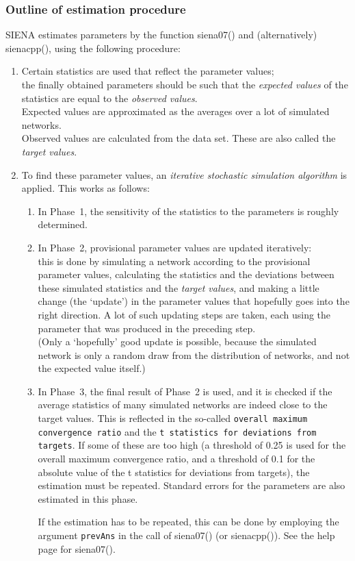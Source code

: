 \documentclass[a4paper,fleqn,11pt]{article}
\newcommand{\+}{\, + \,}
\newcommand{\sfn}[1]{\textsf{#1}}
\newcommand{\SI}{{\sf SIENA }}
\begin{document}
\subsubsection{Outline of estimation procedure}
\label{S_estim}
\noindent
\SI estimates parameters by the function \sfn{siena07()}
and (alternatively) \sfn{sienacpp()}, using the following procedure:
\begin{enumerate}
\item  Certain statistics are used that reflect the parameter values;\\
  the finally obtained parameters should be such that the \emph{expected
    values}
  of the statistics are equal to the \emph{observed values}.\\
  Expected values are approximated as the averages over a lot of simulated
  networks.\\
  Observed values are calculated from the data set. These are also called the
  \emph{target values}.
\item To find these parameter values, an \emph{iterative stochastic simulation
    algorithm}
  is applied.
  This works as follows:
\begin{enumerate}
\item In Phase~1, the sensitivity of the statistics to the parameters is roughly
  determined.
\item In Phase~2, provisional parameter values are updated iteratively:\\
  this is done by simulating a network according to the provisional parameter
  values, calculating the statistics and the deviations between these simulated
  statistics and the \emph{target values}, and making a little change (the
  `update') in the parameter values
  that hopefully goes into the right direction. A lot of such updating steps
  are taken, each using the parameter that was produced in the preceding step.\\
  (Only a `hopefully' good update is possible, because the simulated network is
  only a random draw from the distribution of networks, and not the expected
  value itself.)
\item In Phase~3, the final result of Phase~2 is used, and it is checked if the
  average statistics of many simulated networks are indeed close to the target
  values. This is reflected in the so-called
  \texttt{overall maximum convergence ratio} and the \texttt{t statistics for deviations
  from targets}. If some of these are too high (a threshold of 0.25 is used for the
  overall maximum convergence ratio, and a threshold of 0.1 for the absolute value
  of the t statistics for deviations from targets), the estimation must be repeated.
   Standard errors for the parameters are also estimated in this
  phase.

  If the estimation has to be repeated, this can be done by employing the
  argument \texttt{prevAns} in the call of \sfn{siena07()}
  (or \sfn{sienacpp()}).
  See the help page for  \sfn{siena07()}.
\end{enumerate}
\end{enumerate}
\end{document}
